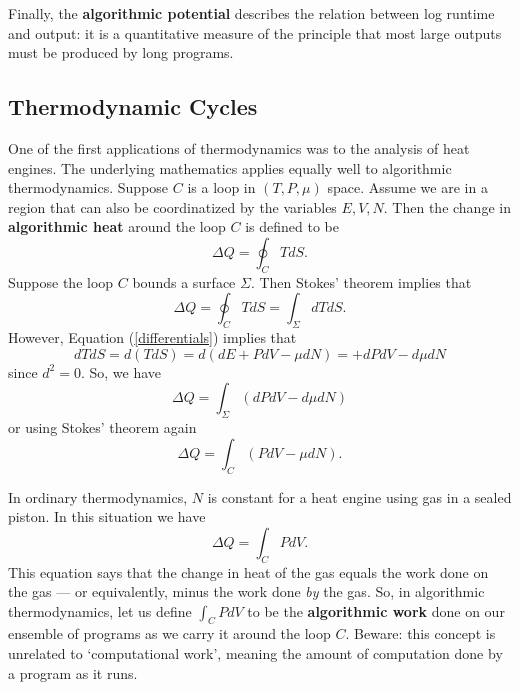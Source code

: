 \documentclass{article}
\begin{document}
Finally, the \textbf{algorithmic potential} describes the relation
between log runtime and output: it is a quantitative measure of the
principle that most large outputs must be produced by long programs.

\subsection{Thermodynamic Cycles} \label{cycles}

One of the first applications of thermodynamics was to the analysis
of heat engines.  The underlying mathematics applies equally well
to algorithmic thermodynamics.  Suppose $C$ is a loop in $(T,P,\mu)$ 
space.  Assume we are in a region that can also be coordinatized by the 
variables $E,V,N$.  Then the change in {\bf algorithmic heat} 
around the loop $C$ is defined to be
\[        \Delta Q = \oint_C T dS  .\]
Suppose the loop $C$ bounds a surface $\Sigma$.  Then Stokes' theorem
implies that
\[        \Delta Q = \oint_C T dS  = \int_{\Sigma} dT dS . \]
However, Equation (\ref{differentials}) implies that
\[    dT dS = d(T dS) = d(dE + P dV - \mu dN) = + dP dV - d\mu dN \]
since $d^2 = 0$.  So, we have
\[      \Delta Q = \int_{\Sigma} (dP dV - d\mu dN)  \]
or using Stokes' theorem again
\begin{equation}
\label{loop}
      \Delta Q = \int_C (P dV - \mu dN). 
\end{equation}

In ordinary thermodynamics, $N$ is constant for a heat engine using
gas in a sealed piston.  In this situation we have
\[
      \Delta Q = \int_C P dV  .
\]
This equation says that the change in heat of the gas equals the work
done on the gas --- or equivalently, minus the work done \emph{by} the
gas.  So, in algorithmic thermodynamics, let us define $\int_C P dV$
to be the {\bf algorithmic work} done on our ensemble of programs as
we carry it around the loop $C$.  Beware: this concept is unrelated to
`computational work', meaning the amount of computation done by a program 
as it runs.
\end{document}
